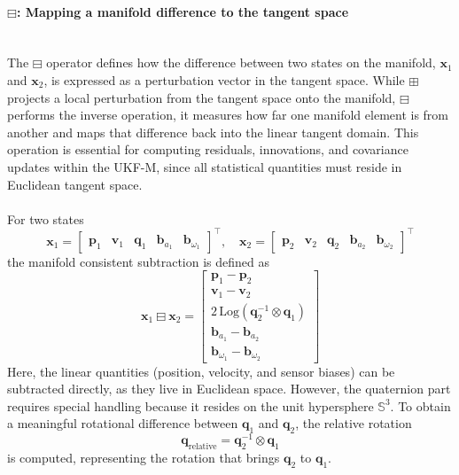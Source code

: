 \paragraph{$\boxminus$: Mapping a manifold difference to the tangent space} \mbox{}\\[0.5em] \noindent
The $\boxminus$ operator defines how the difference between two states on the manifold, $\mathbf{x}_1$ and $\mathbf{x}_2$, is expressed as a perturbation vector in the tangent space. While $\boxplus$ projects a local perturbation from the tangent space onto the manifold, $\boxminus$ performs the inverse operation, it measures how far one manifold element is from another and maps that difference back into the linear tangent domain. This operation is essential for computing residuals, innovations, and covariance updates within the UKF-M, since all statistical quantities must reside in Euclidean tangent space.
\\ \\
For two states
$$
    \mathbf{x}_1 =
    \begin{bmatrix}
        \mathbf{p}_1 & \mathbf{v}_1 & \mathbf{q}_1 & \mathbf{b}_{a_1} & \mathbf{b}_{\omega_1}
    \end{bmatrix}^\top,
    \quad
    \mathbf{x}_2 =
    \begin{bmatrix}
        \mathbf{p}_2 & \mathbf{v}_2 & \mathbf{q}_2 & \mathbf{b}_{a_2} & \mathbf{b}_{\omega_2}
    \end{bmatrix}^\top
$$
the manifold consistent subtraction is defined as
$$
    \mathbf{x}_1 \boxminus \mathbf{x}_2 =
    \begin{bmatrix}
        \mathbf{p}_1 - \mathbf{p}_2 \\
        \mathbf{v}_1 - \mathbf{v}_2 \\
        2\,\mathrm{Log}\!\left(\mathbf{q}_2^{-1} \otimes \mathbf{q}_1\right) \\
        \mathbf{b}_{a_1} - \mathbf{b}_{a_2} \\
        \mathbf{b}_{\omega_1} - \mathbf{b}_{\omega_2}
    \end{bmatrix}
$$
Here, the linear quantities (position, velocity, and sensor biases) can be subtracted directly, as they live in Euclidean space. However, the quaternion part requires special handling because it resides on the unit hypersphere $\mathbb{S}^3$. To obtain a meaningful rotational difference between $\mathbf{q}_1$ and $\mathbf{q}_2$, the relative rotation
$$
    \mathbf{q}_{\text{relative}} = \mathbf{q}_2^{-1} \otimes \mathbf{q}_1
$$
is computed, representing the rotation that brings $\mathbf{q}_2$ to $\mathbf{q}_1$.
